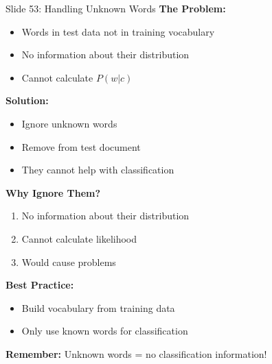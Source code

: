\documentclass[8pt]{beamer}
\begin{document}
	\begin{frame}{Slide 53: Handling Unknown Words}
		\fontsize{6.5}{7.5}\selectfont
		\textbf{The Problem:}
		\begin{itemize}
			\item Words in test data not in training vocabulary
			\item No information about their distribution
			\item Cannot calculate $P(w|c)$
		\end{itemize}
		
		\vspace{0.1cm}
		\textbf{Solution:}
		\begin{itemize}
			\item Ignore unknown words
			\item Remove from test document
			\item They cannot help with classification
		\end{itemize}
		
		\vspace{0.1cm}
		\textbf{Why Ignore Them?}
		\begin{enumerate}
			\item No information about their distribution
			\item Cannot calculate likelihood
			\item Would cause problems
		\end{enumerate}
		
		\vspace{0.1cm}
		\textbf{Best Practice:}
		\begin{itemize}
			\item Build vocabulary from training data
			\item Only use known words for classification
		\end{itemize}
		
		\textcolor{myblue}{\textbf{Remember:}} Unknown words = no classification information!
	\end{frame}
	
\end{document}
